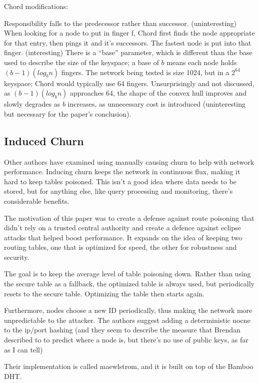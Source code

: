 \documentclass[10pt,letterpaper]{report}
\begin{document}
Chord modifications:  

Responsibility falls to the predecessor rather than successor.   (uninteresting)
When looking for a node to put in finger f, Chord first finds the node appropriate for that entry, then pings it and it's successors.  The fastest node is put into that finger.  (interesting)
There is a ``base'' parameter, which is different than the base used to describe the size of the keyspace;  a base of $b$ means each node  holds $(b-1)(log_b n)$ fingers.  The network being tested is size 1024, but in a $2^64$ keyspace;  Chord would typically use 64 fingers.   Unsurprisingly and not discussed, as $(b-1)(log_b n)$ approaches 64, the shape of the convex hull improves and slowly degrades as $b$ increases, as unnecessary cost is introduced  (uninteresting but necessary for the paper's conclusion).


\subsection{Induced Churn}

Other authors have examined using manually causing  churn to help with network performance.
Inducing churn keeps the network in continuous flux, making it hard to keep tables poisoned.   This isn't a good idea where data needs to be stored, but for anything else, like query processing and monitoring, there's considerable benefits. 

The motivation of this paper was to create a  defense against route poisoning that didn't rely on a trusted central authority and create a defence against eclipse attacks that helped boost performance.  It expands on the idea of keeping two routing tables, one that is optimized for speed, the other for robustness and security.

The goal is to keep the average level of table poisoning down.  Rather than using the secure table as a fallback, the optimized table is always used, but periodically resets to the secure table.  Optimizing the table then starts again.

Furthermore, nodes choose a new ID periodically, thus making the network more unpredictable to the attacker.   The authors suggest adding a deterministic nocne to the ip/port hashing (and they seem to describe the measure that Brendan described to to predict where a node is, but there's no use of public keys, as far as I can tell)

Their implementation is called maewlstrom, and it is built on top of the Bamboo DHT.
\end{document}
